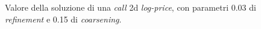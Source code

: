 \documentclass[a4paper,10pt]{report}
\theoremstyle{plain}
\theoremstyle{definition}
\theoremstyle{remark}
\begin{document}
\begin{figure}[htp!]
\begin{center}
\caption{Valore della soluzione di una \emph{call} 2d \emph{log-price}, con parametri 0.03 di \emph{refinement} e 0.15 di \emph{coarsening}.}
\label{fig:test5-1}
\end{center}
\end{figure}
\end{document}
